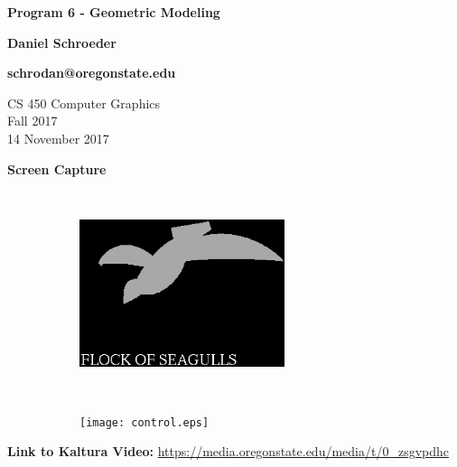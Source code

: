 \documentclass[10pt, draftclsnofoot, onecolumn]{IEEEtran}
\begin{document}
\begin{titlepage}
    \begin{center}
        \vspace*{1.5cm}

        \textbf{Program 6 - Geometric Modeling}

        \textbf{Daniel Schroeder}
        
        \textbf{schrodan@oregonstate.edu}

        \vspace{1.5cm}

        CS 450 Computer Graphics\\
        Fall 2017\\
        14 November 2017\\

        \vspace{1.5cm}

        \textbf{Screen Capture}
               \begin{figure}[H]
                   \centering
                   \begin{subfigure}
                       \centering
                       \includegraphics[width=6cm,height=6cm]{image.eps}
                   \end{subfigure}%
                   \begin{subfigure}
                       \centering
                       \texttt{[image: control.eps]}
                   \end{subfigure}
               \end{figure}
               \vspace{1.5cm}
        \vspace{1.5cm}

        \textbf{Link to Kaltura Video:} 
        \url{https://media.oregonstate.edu/media/t/0_zsgvpdhc}

    \end{center}
\end{titlepage}
\end{document}
